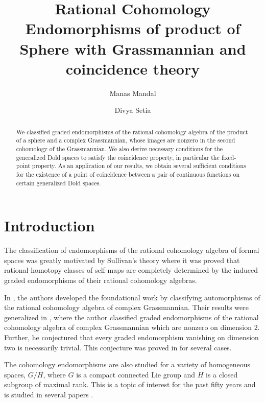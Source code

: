 \documentclass{amsart}
\title[Graded Endomorphisms of $H^*(\mathbb{S}^m \times \mathbb{C}G_{n,k};\mathbb Q)$]{%
Rational Cohomology Endomorphisms of product of Sphere with Grassmannian and coincidence theory%
}
\author[M. Mandal]{Manas Mandal}
\author[D. Setia]{Divya Setia}
\begin{document}
	\begin{abstract}
		We classified graded endomorphisms of the rational cohomology algebra of the product of a sphere and a complex Grassmannian, whose images are nonzero  in the second cohomology of the Grassmannian.
		We also derive necessary conditions for the generalized Dold spaces to satisfy the coincidence property, in particular the fixed-point property. As an application of our results, we obtain several sufficient conditions for the existence of a point of coincidence between a pair of continuous functions on certain generalized Dold spaces. 
	\end{abstract}
	
	\maketitle
	
	\section{Introduction} \label{intro}
	The classification of endomorphisms of the rational cohomology algebra of formal spaces was greatly motivated by Sullivan's theory where it was  proved that rational %
homotopy classes of %
self-maps are completely determined by the induced graded endomorphisms of their rational cohomology algebras. 
	
	In \cite{brewster}, the authors developed the foundational work by classifying automorphisms of the rational cohomology algebra of complex Grassmannian. Their results were generalized in \cite{hoffman}, where the author classified graded endomorphisms of the rational cohomology algebra of complex Grassmannian which are nonzero on dimension $2$. Further, he conjectured that every graded endomorphism  vanishing on dimension two is necessarily trivial. This conjecture was proved in \cite{glover-homer} for several cases.
	
	The cohomology endomorphisms are also studied for a variety of %
homogeneous spaces, $G/H$, %
where $G$ is a compact connected Lie group and $H$ is a closed
	subgroup of maximal rank. This is a topic of %
interest for the past %
fifty years %
and is studied %
in several papers \cite{shiga-tezuka2, brewster-homer, hoffman-homer, Papadima, duan, duan-fang, duan-zhao, lin, goswami-sarkar}. 
	
\end{document}
